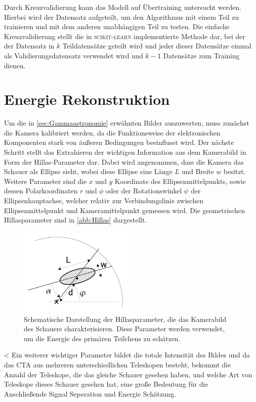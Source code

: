 Durch Kreuzvalidierung kann das Modell auf Übertraining untersucht werden. Hierbei wird der Datensatz aufgeteilt, um
den Algorithmus mit einem Teil zu trainieren und mit dem anderen unabhängigen Teil zu testen.
Die einfache Kreuzvalidierung stellt die in \textsc{scikit-learn} implementierte Methode dar, bei der der Datensatz
in $k$ Teildatensätze geteilt wird und jeder dieser Datensätze einmal als Validierungsdatensatz
verwendet wird und $k-1$ Datensätze zum Training dienen.

\section{Energie Rekonstruktion}

Um die in \autoref{sec:Gammaastronomie} erwähnten Bilder auszuwerten, muss zunächst die Kamera kalibriert werden, da die Funktionsweise der elektronischen
Komponenten stark von äußeren Bedingungen beeinflusst wird.
Der nächste Schritt stellt das Extrahieren der wichtigen Information aus dem Kamerabild in Form der Hillas-Parameter dar.
Dabei wird angenommen, dass die Kamera das Schauer als Ellipse sieht, wobei diese Ellipse eine Länge $L$ und Breite $w$ besitzt.
Weitere Parameter sind die $x$ und $y$ Koordinate des Ellipsenmittelpunkts, sowie dessen Polarkoordinaten $r$ und $\phi$ oder der Rotationswinkel $\psi$
der Ellipsenhauptachse, welcher relativ zur Verbindungslinie zwischen Ellipsenmittelpunkt und Kameramittelpunkt gemessen wird.
Die geometrischen Hillasparameter sind in \autoref{abb:Hillas} dargestellt.
\begin{figure}
  \includegraphics[width=0.5\textwidth]{Plots/Hillas.JPG}
  \centering
  \caption{Schematische Darstellung der Hillasparameter, die das Kamerabild des Schauers charakterisieren. Diese Parameter
            werden verwendet, um die Energie des primären Teilchens zu schätzen.}
  \label{abb:Hillas}
\end{figure}<
Ein weiterer wichtiger Parameter bildet die totale Intensität des Bildes und da das CTA aus mehreren unterschiedlichen Teleskopen besteht, bekommt die Anzahl
der Teleskope, die das gleiche Schauer gesehen haben, und welche Art von Teleskope dieses Schauer gesehen hat, eine große Bedeutung für die Anschließende
Signal Seperation und Energie Schätzung.

